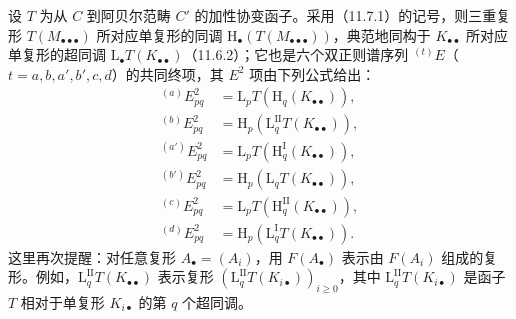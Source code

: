 设 $T$ 为从 $C$ 到阿贝尔范畴 $C'$ 的加性协变函子。采用（11.7.1）的记号，则三重复形 $T(M_{\bullet\bullet\bullet})$ 所对应单复形的同调 $\mathrm H_\bullet(T(M_{\bullet\bullet\bullet}))$，典范地同构于 $K_{\bullet\bullet}$ 所对应单复形的超同调 $\mathrm L_\bullet T(K_{\bullet\bullet})$（11.6.2）；它也是六个双正则谱序列 ${}^{(t)}E$（$t=a,b,a',b',c,d$）的共同终项，其 $E^2$ 项由下列公式给出：
\[
\begin{aligned}
{}^{(a)}E^2_{pq}&=\mathrm L_pT(\mathrm H_q(K_{\bullet\bullet})),\\
{}^{(b)}E^2_{pq}&=\mathrm H_p(\mathrm L_q^{\mathrm{II}}T(K_{\bullet\bullet})),\\
{}^{(a')}E^2_{pq}&=\mathrm L_pT(\mathrm H_q^{\mathrm I}(K_{\bullet\bullet})),\\
{}^{(b')}E^2_{pq}&=\mathrm H_p(\mathrm L_qT(K_{\bullet\bullet})),\\
{}^{(c)}E^2_{pq}&=\mathrm L_pT(\mathrm H_q^{\mathrm{II}}(K_{\bullet\bullet})),\\
{}^{(d)}E^2_{pq}&=\mathrm H_p(\mathrm L_q^{\mathrm I}T(K_{\bullet\bullet})).
\end{aligned}
\]
这里再次提醒：对任意复形 $A_\bullet=(A_i)$，用 $F(A_\bullet)$ 表示由 $F(A_i)$ 组成的复形。例如，$\mathrm L_q^{\mathrm{II}}T(K_{\bullet\bullet})$ 表示复形 $(\mathrm L_q^{\mathrm{II}}T(K_{i\bullet}))_{i\geq0}$，其中 $\mathrm L_q^{\mathrm{II}}T(K_{i\bullet})$ 是函子 $T$ 相对于单复形 $K_{i\bullet}$ 的第 $q$ 个超同调。
